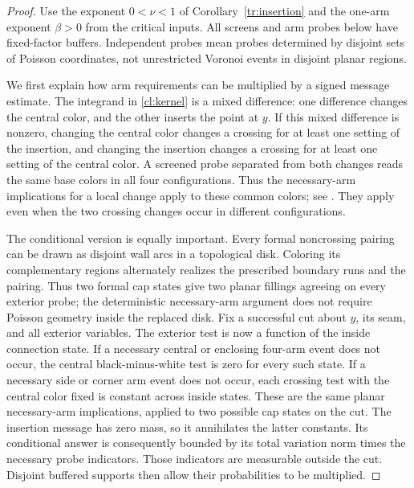 \begin{proof}
Use the exponent $0<\nu<1$ of Corollary~\ref{tr:insertion} and
the one-arm exponent $\beta>0$ from the critical inputs. All screens
and arm probes below have fixed-factor buffers. Independent probes
mean probes determined by disjoint sets of Poisson coordinates,
not unrestricted Voronoi events in disjoint planar regions.

We first explain how arm requirements can be multiplied by a signed
message estimate. The integrand in \eqref{cl:kernel} is a mixed
difference: one difference changes the central color, and the other
inserts the point at $y$. If this mixed difference is nonzero, changing
the central color changes a crossing for at least one setting of the
insertion, and changing the insertion changes a crossing for at least
one setting of the central color. A screened probe separated from
both changes reads the same base colors in all four configurations.
Thus the necessary-arm implications for a local change apply to
these common colors; see \cite[Section~2, ``Necessary arms for a
local change'']{V}. They apply even when the two crossing changes
occur in different configurations.

The conditional version is equally important. Every formal noncrossing
pairing can be drawn as disjoint wall arcs in a topological disk.
Coloring its complementary regions alternately realizes the prescribed
boundary runs and the pairing. Thus two formal cap states give two
planar fillings agreeing on every exterior probe; the deterministic
necessary-arm argument does not require Poisson geometry inside the
replaced disk. Fix a successful
cut about $y$, its seam, and all exterior variables. The exterior
test is now a function of the inside connection state. If a
necessary central or enclosing four-arm event does not occur,
the central black-minus-white test is zero for every such state.
If a necessary side or corner arm event does not occur, each
crossing test with the central color fixed is constant across
inside states. These are
the same planar necessary-arm implications, applied to two
possible cap states on the cut. The insertion message has zero
mass, so it annihilates the latter constants. Its conditional
answer is consequently bounded by its total variation norm times
the necessary probe indicators. Those indicators are measurable
outside the cut. Disjoint buffered supports then allow their
probabilities to be multiplied.


\end{proof}
